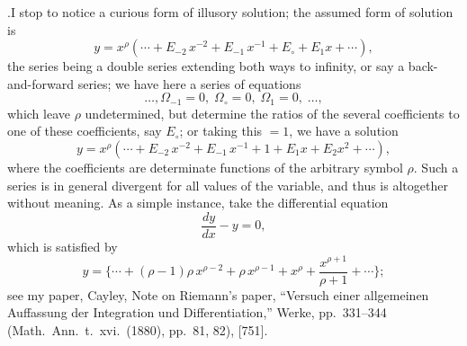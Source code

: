 \documentclass[11pt]{article}
\begin{document}
\medskip

.\quad I stop to notice a curious form of illusory solution; the assumed form of solution is
\[
y = x^{\rho}(\dotsb + E_{-2}\,x^{-2} + E_{-1}\,x^{-1} + E_{\circ} + E_1 x + \dotsb),
\]
the series being a double series extending both ways to infinity, or say a back-and-forward series; we have here a series of equations
\[
\dotsc, \Omega_{-1}=0,\; \Omega_{\circ}=0,\; \Omega_1=0,\; \dotsc,
\]
which leave $\rho$ undetermined, but determine the ratios of the several coefficients to one of these coefficients, say $E_{\circ}$; or taking this $=1$, we have a solution
\[
y = x^{\rho}(\dotsb + E_{-2}\,x^{-2} + E_{-1}\,x^{-1} + 1 + E_1 x + E_2 x^2 + \dotsb),
\]
where the coefficients are determinate functions of the arbitrary symbol $\rho$. Such a series is in general divergent for all values of the variable, and thus is altogether without meaning. As a simple instance, take the differential equation
\[
\frac{dy}{dx} - y = 0,
\]
which is satisfied by
\[
y = \{\dotsb + (\rho-1)\rho\,x^{\rho-2} + \rho\,x^{\rho-1} + x^{\rho} + \frac{x^{\rho+1}}{\rho+1} + \dotsb\};
\]
see my paper, Cayley, Note on Riemann's paper, ``Versuch einer allgemeinen Auffassung der Integration und Differentiation,'' Werke, pp.\ 331--344 (Math.\ Ann.\ t.\ xvi.\ (1880), pp.\ 81, 82), [751].

\medskip
\end{document}
